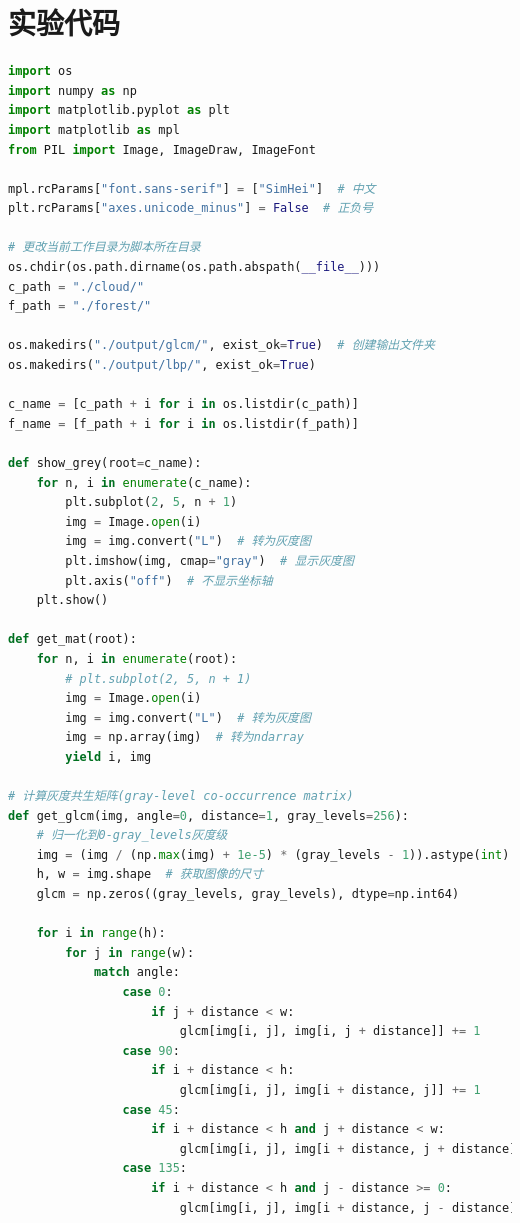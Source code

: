 \documentclass[a4paper,12pt]{report}
\begin{document}
\section{实验代码}
\begin{lstlisting}[language=Python]
import os
import numpy as np
import matplotlib.pyplot as plt
import matplotlib as mpl
from PIL import Image, ImageDraw, ImageFont

mpl.rcParams["font.sans-serif"] = ["SimHei"]  # 中文
plt.rcParams["axes.unicode_minus"] = False  # 正负号

# 更改当前工作目录为脚本所在目录
os.chdir(os.path.dirname(os.path.abspath(__file__)))  
c_path = "./cloud/"
f_path = "./forest/"

os.makedirs("./output/glcm/", exist_ok=True)  # 创建输出文件夹
os.makedirs("./output/lbp/", exist_ok=True)

c_name = [c_path + i for i in os.listdir(c_path)]
f_name = [f_path + i for i in os.listdir(f_path)]

def show_grey(root=c_name):
    for n, i in enumerate(c_name):
        plt.subplot(2, 5, n + 1)
        img = Image.open(i)
        img = img.convert("L")  # 转为灰度图
        plt.imshow(img, cmap="gray")  # 显示灰度图
        plt.axis("off")  # 不显示坐标轴
    plt.show()

def get_mat(root):
    for n, i in enumerate(root):
        # plt.subplot(2, 5, n + 1)
        img = Image.open(i)
        img = img.convert("L")  # 转为灰度图
        img = np.array(img)  # 转为ndarray
        yield i, img

# 计算灰度共生矩阵(gray-level co-occurrence matrix)
def get_glcm(img, angle=0, distance=1, gray_levels=256):
    # 归一化到0-gray_levels灰度级
    img = (img / (np.max(img) + 1e-5) * (gray_levels - 1)).astype(int)  
    h, w = img.shape  # 获取图像的尺寸
    glcm = np.zeros((gray_levels, gray_levels), dtype=np.int64)

    for i in range(h):
        for j in range(w):
            match angle:
                case 0:
                    if j + distance < w:
                        glcm[img[i, j], img[i, j + distance]] += 1
                case 90:
                    if i + distance < h:
                        glcm[img[i, j], img[i + distance, j]] += 1
                case 45:
                    if i + distance < h and j + distance < w:
                        glcm[img[i, j], img[i + distance, j + distance]] += 1
                case 135:
                    if i + distance < h and j - distance >= 0:
                        glcm[img[i, j], img[i + distance, j - distance]] += 1


\end{lstlisting}
\end{document}
